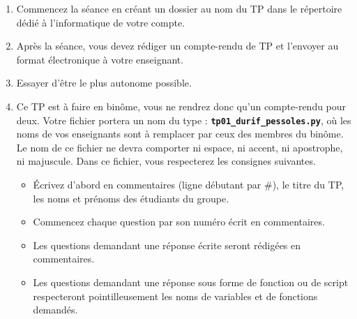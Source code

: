 \begin{enumerate}
\item Commencez la séance en créant un dossier au nom du TP dans le répertoire dédié à l'informatique de votre compte. 
\item Après la séance, vous devez rédiger un compte-rendu de TP et
l'envoyer au format électronique à votre enseignant.
\item Essayer d'être le plus autonome possible. 
\item Ce TP est à faire en binôme, vous ne rendrez donc qu'un  compte-rendu pour deux.
Votre fichier portera un nom du type : \textbf{\texttt{tp01\_durif\_pessoles.py}}, où les noms de vos enseignants sont à remplacer par ceux des membres du binôme. Le nom de ce 
fichier ne devra comporter ni espace, ni accent, ni apostrophe, ni majuscule.
Dans ce fichier, vous respecterez les consignes suivantes.
\begin{itemize}
  \item \'Ecrivez d'abord en commentaires (ligne débutant par \#), le titre du TP, les noms et prénoms des étudiants du groupe.
  \item Commencez chaque question par son numéro écrit en commentaires.
  \item Les questions demandant une réponse écrite seront rédigées en commentaires.
  \item Les questions demandant une réponse sous forme de fonction ou de script respecteront pointilleusement les noms de variables et de fonctions demandés.
\end{itemize}
\end{enumerate}


